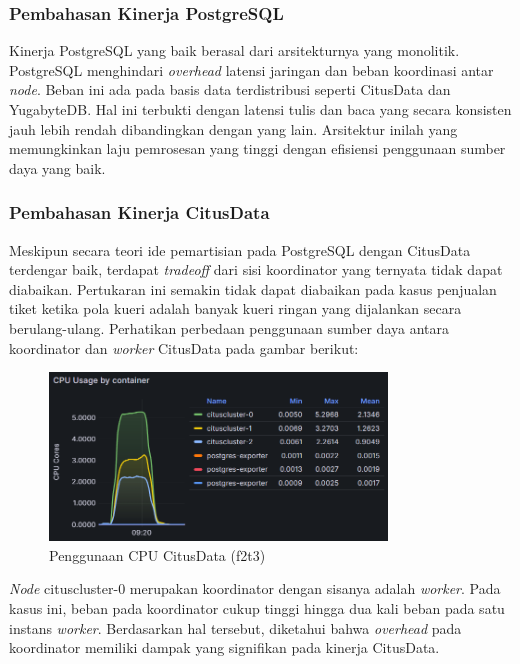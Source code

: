 \subsubsection{Pembahasan Kinerja PostgreSQL}

Kinerja PostgreSQL yang baik berasal dari arsitekturnya yang monolitik. PostgreSQL menghindari \textit{overhead} latensi jaringan dan beban koordinasi antar \textit{node}. Beban ini ada pada basis data terdistribusi seperti CitusData dan YugabyteDB. Hal ini terbukti dengan latensi tulis dan baca yang secara konsisten jauh lebih rendah dibandingkan dengan yang lain. Arsitektur inilah yang memungkinkan laju pemrosesan yang tinggi dengan efisiensi penggunaan sumber daya yang baik.

\subsubsection{Pembahasan Kinerja CitusData}

Meskipun secara teori ide pemartisian pada PostgreSQL dengan CitusData terdengar baik, terdapat \textit{tradeoff} dari sisi koordinator yang ternyata tidak dapat diabaikan. Pertukaran ini semakin tidak dapat diabaikan pada kasus penjualan tiket ketika pola kueri adalah banyak kueri ringan yang dijalankan secara berulang-ulang. Perhatikan perbedaan penggunaan sumber daya antara koordinator dan \textit{worker} CitusData pada gambar berikut:

\begin{figure}[htbp]
    \centering
    \includegraphics[width=0.8\textwidth]{resources/chapter-4/citusdata-usage.png}
    \caption{Penggunaan CPU CitusData (f2t3)}
    \label{fig:citusdata-usage}
\end{figure}

\textit{Node} cituscluster-0 merupakan koordinator dengan sisanya adalah \textit{worker}. Pada kasus ini, beban pada koordinator cukup tinggi hingga dua kali beban pada satu instans \textit{worker}. Berdasarkan hal tersebut, diketahui bahwa \textit{overhead} pada koordinator memiliki dampak yang signifikan pada kinerja CitusData.

